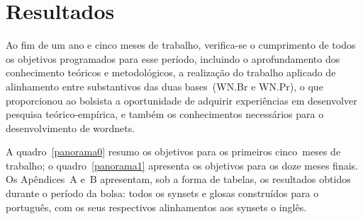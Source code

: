 \chapter{Resultados}


Ao fim de um ano e cinco meses de trabalho, verifica-se o cumprimento de todos
os objetivos programados para esse período, incluindo o aprofundamento dos
conhecimento teóricos e metodológicos, a realização do trabalho aplicado de
alinhamento entre substantivos das duas bases~(WN.Br e WN.Pr), o que
proporcionou ao bolsista a oportunidade de adquirir experiências em desenvolver
pesquisa teórico-empírica, e também os conhecimentos necessários para o
desenvolvimento de wordnets.
\enlargethispage{\baselineskip}

A quadro~\ref{panorama0} resumo os objetivos para os primeiros cinco~meses de
trabalho; o quadro~\ref{panorama1} apresenta os objetivos para os doze meses
finais. Os Apêndices~A e~B apresentam, sob a forma de tabelas, os resultados
obtidos durante o período da bolsa: todos os synsets e glosas construídos para
o português, com os seus respectivos alinhamentos aos synsets o inglês.


